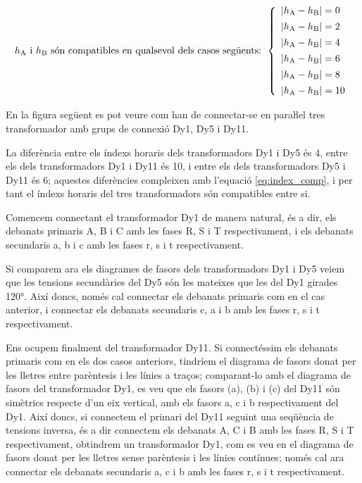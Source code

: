 \begin{equation}
    h_\mathrm{A} \text{ i } h_\mathrm{B} \text{ són compatibles en qualsevol dels casos següents: }
    \left\{
        \begin{array}{l}
           |h_\mathrm{A} - h_\mathrm{B}| = 0 \\[1ex]
           |h_\mathrm{A} - h_\mathrm{B}| = 2 \\[1ex]
           |h_\mathrm{A} - h_\mathrm{B}| = 4 \\[1ex]
           |h_\mathrm{A} - h_\mathrm{B}| = 6 \\[1ex]
           |h_\mathrm{A} - h_\mathrm{B}| = 8 \\[1ex]
           |h_\mathrm{A} - h_\mathrm{B}| = 10
        \end{array}
    \right.
    \label{eq:index_comp}
\end{equation}


\begin{exemple}
    En la figura següent es pot veure com han de connectar-se en paraŀlel tres transformador amb grups de connexió Dy1, Dy5 i Dy11.

      La diferència entre els índexs horaris dels transformadors Dy1 i Dy5 és 4, entre els dels transformadors Dy1 i Dy11 és 10, i entre els dels transformadors Dy5 i Dy11 és 6; aquestes diferències compleixen amb l'equació \eqref{eq:index_comp}, i per tant el índexs horaris del tres transformadors són compatibles entre si.


    Comencem connectant el  transformador Dy1 de manera natural, és a dir, els debanats primaris A, B i C amb les fases R, S i T respectivament, i els debanats secundaris a, b i c amb les fases r, s i t respectivament.

   \begin{center}
        
    \end{center}

    Si comparem ara els diagrames de fasors dels transformadors Dy1 i Dy5 veiem que les tensions secundàries del Dy5 són les mateixes que les del Dy1 girades \ang{120}. Així doncs, només  cal connectar els debanats primaris com en el cas anterior, i connectar els debanats secundaris c, a i b amb les fases r, s i t respectivament.


    Ens ocupem finalment del transformador Dy11. Si connectéssim els debanats primaris com en els dos casos anteriors, tindríem el diagrama de fasors donat per les lletres entre parèntesis i les línies a traços; comparant-lo amb el diagrama de fasors del transformador Dy1, es veu que els fasors (a), (b) i (c) del Dy11 són simètrics respecte d'un eix vertical, amb els fasors a, c i b respectivament del Dy1. Així doncs, si connectem el primari del Dy11 seguint una seqüència de tensions inversa, és a dir connectem els debanats A, C i B amb les fases R, S i T respectivament, obtindrem un transformador Dy1, com es veu en el diagrama de fasors donat per les lletres sense parèntesis i les línies contínues; només cal ara connectar els debanats secundaris a, c i b amb les fases r, s i t respectivament.
\end{exemple}

